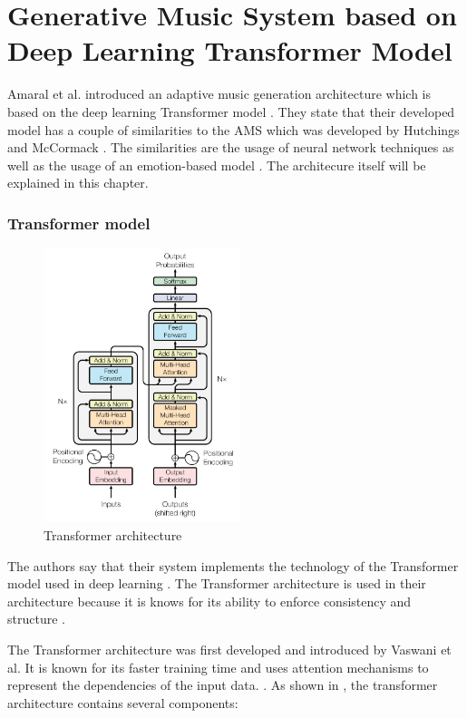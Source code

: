 \section{Generative Music System based on Deep Learning Transformer Model}

Amaral et al. introduced an adaptive music generation
architecture which is based on the deep learning 
Transformer model \cite{amaral2022adaptive}.
They state that their developed model has a couple of similarities
to the AMS \cite{hutMcCormAms} which was developed by Hutchings and 
McCormack \cite{amaral2022adaptive}. The similarities are the usage of
neural network techniques as well as the usage of an emotion-based model \cite{amaral2022adaptive}. The architecure itself will be explained 
in this chapter.

\subsubsection{Transformer model}

\begin{figure}[h]
    \centering
    \includegraphics[height=8cm]{images/transformer_architecture.png}
    \caption{Transformer architecture \cite{vaswani2017transformer}}
    \label{fig:transformer_architecture}
\end{figure}

The authors say that their system implements the technology of the 
Transformer model used in deep learning \cite{amaral2022adaptive}. 
The Transformer architecture \cite{vaswani2017transformer} is used in 
their architecture because it is knows for its ability to enforce consistency and structure \cite{amaral2022adaptive}.

The Transformer architecture was first developed and introduced by 
Vaswani et al. It is known for its faster training time and uses attention mechanisms
to represent the dependencies of the input data. \cite{vaswani2017transformer}. 
As shown in , the
transformer architecture contains several components:

